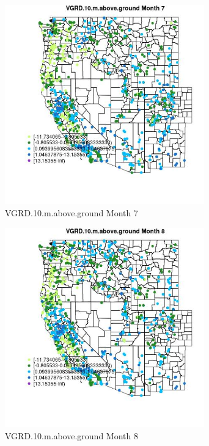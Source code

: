 \begin{figure} 
\centering  
\includegraphics[width=0.77\textwidth]{Code_Outputs/Report_ML_input_PM25_Step4_part_f_de_duplicated_aves_prioritize_24hr_obswNAs_MapObsMo7VGRD10maboveground.jpg} 
\caption{\label{fig:Report_ML_input_PM25_Step4_part_f_de_duplicated_aves_prioritize_24hr_obswNAsMapObsMo7VGRD10maboveground}VGRD.10.m.above.ground Month 7} 
\end{figure} 
 

\begin{figure} 
\centering  
\includegraphics[width=0.77\textwidth]{Code_Outputs/Report_ML_input_PM25_Step4_part_f_de_duplicated_aves_prioritize_24hr_obswNAs_MapObsMo8VGRD10maboveground.jpg} 
\caption{\label{fig:Report_ML_input_PM25_Step4_part_f_de_duplicated_aves_prioritize_24hr_obswNAsMapObsMo8VGRD10maboveground}VGRD.10.m.above.ground Month 8} 
\end{figure} 
 

